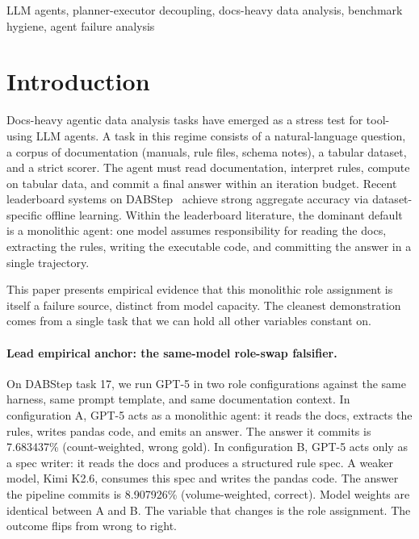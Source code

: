 \documentclass[conference]{IEEEtran}
\newcommand{\Kimi}{Kimi K2.6}
\begin{document}
\begin{IEEEkeywords}
LLM agents, planner-executor decoupling, docs-heavy data analysis, benchmark hygiene, agent failure analysis
\end{IEEEkeywords}

\section{Introduction}
\label{sec:intro}

Docs-heavy agentic data analysis tasks have emerged as a stress test for tool-using LLM agents. A task in this regime consists of a natural-language question, a corpus of documentation (manuals, rule files, schema notes), a tabular dataset, and a strict scorer. The agent must read documentation, interpret rules, compute on tabular data, and commit a final answer within an iteration budget. Recent leaderboard systems on DABStep~\cite{dabstep2025} achieve strong aggregate accuracy via dataset-specific offline learning. Within the leaderboard literature, the dominant default is a monolithic agent: one model assumes responsibility for reading the docs, extracting the rules, writing the executable code, and committing the answer in a single trajectory.

This paper presents empirical evidence that this monolithic role assignment is itself a failure source, distinct from model capacity. The cleanest demonstration comes from a single task that we can hold all other variables constant on.

\paragraph{Lead empirical anchor: the same-model role-swap falsifier.}
On DABStep task 17, we run GPT-5 in two role configurations against the same harness, same prompt template, and same documentation context. In configuration A, GPT-5 acts as a monolithic agent: it reads the docs, extracts the rules, writes pandas code, and emits an answer. The answer it commits is 7.683437\% (count-weighted, wrong gold). In configuration B, GPT-5 acts only as a spec writer: it reads the docs and produces a structured rule spec. A weaker model, \Kimi{}, consumes this spec and writes the pandas code. The answer the pipeline commits is 8.907926\% (volume-weighted, correct). Model weights are identical between A and B. The variable that changes is the role assignment. The outcome flips from wrong to right.
\end{document}
